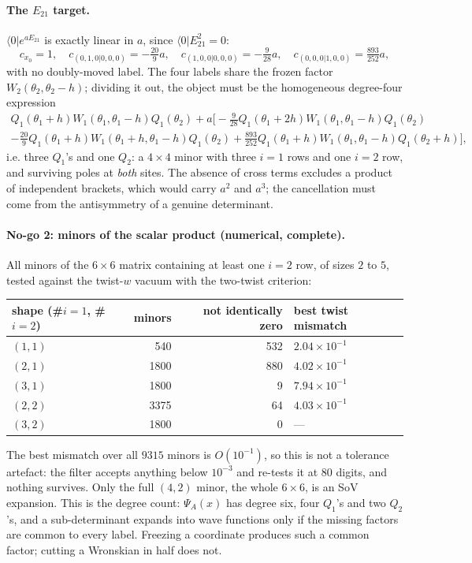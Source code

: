 \documentclass[11pt]{article}
\newcommand{\vac}{\langle 0|}
\begin{document}
\paragraph{The $E_{21}$ target.} $\vac e^{aE_{21}}$ is exactly linear in $a$, since
$\vac E_{21}^2=0$:
\begin{equation}
c_{x_0}=1,\quad c_{(0,1,0|0,0,0)}=-\tfrac{20}{9}a,\quad c_{(1,0,0|0,0,0)}=-\tfrac{9}{28}a,\quad
c_{(0,0,0|1,0,0)}=\tfrac{893}{252}a,
\end{equation}
with no doubly-moved label. The four labels share the frozen factor $W_2(\theta_2,\theta_2-h)$;
dividing it out, the object must be the homogeneous degree-four expression
\begin{multline}
Q_1(\theta_1{+}h)W_1(\theta_1,\theta_1{-}h)Q_1(\theta_2)
+a\Big[-\tfrac{9}{28}Q_1(\theta_1{+}2h)W_1(\theta_1,\theta_1{-}h)Q_1(\theta_2)\\
-\tfrac{20}{9}Q_1(\theta_1{+}h)W_1(\theta_1{+}h,\theta_1{-}h)Q_1(\theta_2)
+\tfrac{893}{252}Q_1(\theta_1{+}h)W_1(\theta_1,\theta_1{-}h)Q_1(\theta_2{+}h)\Big],
\end{multline}
i.e. three $Q_1$'s and one $Q_2$: a $4\times4$ minor with three $i=1$ rows and one $i=2$ row, and
surviving poles at \emph{both} sites. The absence of cross terms excludes a product of independent
brackets, which would carry $a^2$ and $a^3$; the cancellation must come from the antisymmetry of a
genuine determinant.

\paragraph{No-go 2: minors of the scalar product (numerical, complete).} All minors of the
$6\times6$ matrix containing at least one $i=2$ row, of sizes $2$ to $5$, tested against the
twist-$w$ vacuum with the two-twist criterion:
\begin{center}
\begin{tabular}{lrrl}
\toprule
shape (\#$i{=}1$, \#$i{=}2$) & minors & not identically zero & best twist mismatch\\
\midrule
$(1,1)$ & 540 & 532 & $2.04\times10^{-1}$\\
$(2,1)$ & 1800 & 880 & $4.02\times10^{-1}$\\
$(3,1)$ & 1800 & 9 & $7.94\times10^{-1}$\\
$(2,2)$ & 3375 & 64 & $4.03\times10^{-1}$\\
$(3,2)$ & 1800 & 0 & ---\\
\bottomrule
\end{tabular}
\end{center}
The best mismatch over all $9315$ minors is $O(10^{-1})$, so this is not a tolerance artefact: the
filter accepts anything below $10^{-3}$ and re-tests it at $80$ digits, and nothing survives. Only
the full $(4,2)$ minor, the whole $6\times6$, is an SoV expansion. This is the degree count:
$\Psi_A(x)$ has degree six, four $Q_1$'s and two $Q_2$'s, and a sub-determinant expands into wave
functions only if the missing factors are common to every label. Freezing a coordinate produces such
a common factor; cutting a Wronskian in half does not.
\end{document}
